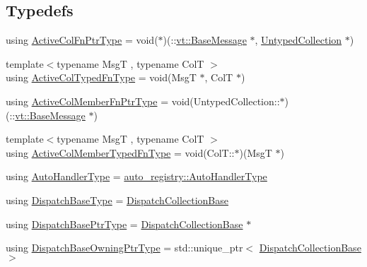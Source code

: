 \subsection*{Typedefs}
\begin{DoxyCompactItemize}
\item 
using \hyperlink{namespacevt_1_1vrt_1_1collection_ab2e800e37837a2afe33996fe8f5fabea}{Active\+Col\+Fn\+Ptr\+Type} = void($\ast$)(\+::\hyperlink{namespacevt_ac34f95a5e2b8109b55bfba52b074443d}{vt\+::\+Base\+Message} $\ast$, \hyperlink{structvt_1_1vrt_1_1collection_1_1_untyped_collection}{Untyped\+Collection} $\ast$)
\item 
{\footnotesize template$<$typename MsgT , typename ColT $>$ }\\using \hyperlink{namespacevt_1_1vrt_1_1collection_a1f4b9c5fe895842f49952a29592bc206}{Active\+Col\+Typed\+Fn\+Type} = void(MsgT $\ast$, ColT $\ast$)
\item 
using \hyperlink{namespacevt_1_1vrt_1_1collection_aa4614a0de67301c62259b0763a86f473}{Active\+Col\+Member\+Fn\+Ptr\+Type} = void(Untyped\+Collection\+::$\ast$)(\+::\hyperlink{namespacevt_ac34f95a5e2b8109b55bfba52b074443d}{vt\+::\+Base\+Message} $\ast$)
\item 
{\footnotesize template$<$typename MsgT , typename ColT $>$ }\\using \hyperlink{namespacevt_1_1vrt_1_1collection_a87925616c03cf4ccc548d33b2fe172ee}{Active\+Col\+Member\+Typed\+Fn\+Type} = void(Col\+T\+::$\ast$)(MsgT $\ast$)
\item 
using \hyperlink{namespacevt_1_1vrt_1_1collection_af50831782f9d77f86d626f858f295c37}{Auto\+Handler\+Type} = \hyperlink{namespacevt_1_1auto__registry_ae295e18699146815bb7d7674594d95d7}{auto\+\_\+registry\+::\+Auto\+Handler\+Type}
\item 
using \hyperlink{namespacevt_1_1vrt_1_1collection_a9e2462f78f56998464ffc7f35369c70f}{Dispatch\+Base\+Type} = \hyperlink{structvt_1_1vrt_1_1collection_1_1_dispatch_collection_base}{Dispatch\+Collection\+Base}
\item 
using \hyperlink{namespacevt_1_1vrt_1_1collection_aa3b9731ae16d60fac43d68840f3606a5}{Dispatch\+Base\+Ptr\+Type} = \hyperlink{structvt_1_1vrt_1_1collection_1_1_dispatch_collection_base}{Dispatch\+Collection\+Base} $\ast$
\item 
using \hyperlink{namespacevt_1_1vrt_1_1collection_a124f83d203352b6bccc4f12ca489b68b}{Dispatch\+Base\+Owning\+Ptr\+Type} = std\+::unique\+\_\+ptr$<$ \hyperlink{structvt_1_1vrt_1_1collection_1_1_dispatch_collection_base}{Dispatch\+Collection\+Base} $>$

\end{DoxyCompactItemize}
